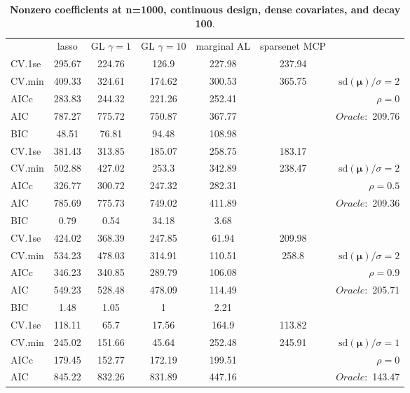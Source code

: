 \begin{table}\vspace{-.5cm}
\caption[l]{ { \bf Nonzero coefficients at n=1000, continuous design, 
dense covariates, and  decay  100}.}
\vspace{-.5cm}
\footnotesize{}
\begin{center}
\begin{tabular}{l*{5}{c}|r}
& lasso & GL $\gamma=1$ & GL $\gamma=10$ & marginal AL & sparsenet MCP  & \\
 \cline{1-7}
CV.1se & 295.67 & 224.76 & 126.9 & 227.98 & 237.94 & \\
CV.min & 409.33 & 324.61 & 174.62 & 300.53 & 365.75 &  $\mathrm{sd}(\mathbf{\mu})/\sigma=2$ \\
AICc & 283.83 & 244.32 & 221.26 & 252.41 & & $\rho=0$ \\
AIC & 787.27 & 775.72 & 750.87 & 367.77 & &  \multirow{2}{*}{$Oracle: $ 209.76} \\
BIC & 48.51 & 76.81 & 94.48 & 108.98 & &  \\
 \hline 
CV.1se & 381.43 & 313.85 & 185.07 & 258.75 & 183.17 & \\
CV.min & 502.88 & 427.02 & 253.3 & 342.89 & 238.47 &  $\mathrm{sd}(\mathbf{\mu})/\sigma=2$ \\
AICc & 326.77 & 300.72 & 247.32 & 282.31 & & $\rho=0.5$ \\
AIC & 785.69 & 775.73 & 749.02 & 411.89 & &  \multirow{2}{*}{$Oracle: $ 209.36} \\
BIC & 0.79 & 0.54 & 34.18 & 3.68 & &  \\
 \hline 
CV.1se & 424.02 & 368.39 & 247.85 & 61.94 & 209.98 & \\
CV.min & 534.23 & 478.03 & 314.91 & 110.51 & 258.8 &  $\mathrm{sd}(\mathbf{\mu})/\sigma=2$ \\
AICc & 346.23 & 340.85 & 289.79 & 106.08 & & $\rho=0.9$ \\
AIC & 549.23 & 528.48 & 478.09 & 114.49 & &  \multirow{2}{*}{$Oracle: $ 205.71} \\
BIC & 1.48 & 1.05 & 1 & 2.21 & &  \\
 \hline 
CV.1se & 118.11 & 65.7 & 17.56 & 164.9 & 113.82 & \\
CV.min & 245.02 & 151.66 & 45.64 & 252.48 & 245.91 &  $\mathrm{sd}(\mathbf{\mu})/\sigma=1$ \\
AICc & 179.45 & 152.77 & 172.19 & 199.51 & & $\rho=0$ \\
AIC & 845.22 & 832.26 & 831.89 & 447.16 & &  \multirow{2}{*}{$Oracle: $ 143.47} \\

\end{tabular}
\end{center}
\end{table}
